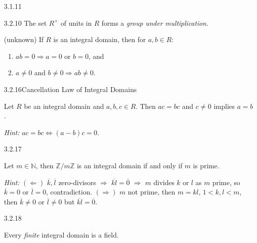 \documentclass[10pt]{article} %
\newcommand{\Hint}{\vspace{0.2em}\textit{Hint: }}
\begin{document}
\begin{multicols}{3}
\begin{proposition}{3.1.11}{}
\end{proposition}

\begin{proposition}{3.2.10}{}
    The set $R^{\times}$ of units in $R$ forms a \emph{group under multiplication}.
\end{proposition}

\begin{remark}{(unknown)}{}
    If $R$ is an integral domain, then for $a,b \in R$:

    \begin{enumerate}[(1)]
        \setlength{\parskip}{0em}
        \item $ab = 0 \Rightarrow a = 0$ or $b = 0$, and
        \item $a \neq 0$ and $b \neq 0 \Rightarrow ab \neq 0$.
    \end{enumerate}
\end{remark}

\begin{proposition}{3.2.16}{Cancellation Law of Integral Domains}

    Let $R$ be an integral domain and $a,b,c \in R$. Then $ac = bc$ and $c \neq 0$ implies $a = b$.

    \Hint $ac = bc \Leftrightarrow (a - b)c = 0$.

\end{proposition}

\begin{proposition}{3.2.17}{}

    Let $m \in \mathbb{N}$, then $\mathbb{Z}/m\mathbb{Z}$ is an integral domain if and only if $m$ is prime.

    \Hint $(\Leftarrow)$ $\overline{k},\overline{l}$ zero-divisors $\Rightarrow$ $\overline{kl}=\overline{0}$ $\Rightarrow$ $m$ divides $k$ or $l$ as $m$ prime, so $\overline{k} = 0$ or $\overline{l} = 0$, contradiction. $(\Rightarrow)$ $m$ not prime, then $m = kl$, $1 < k,l < m$, then $\overline{k} \neq 0$ or $\overline{l} \neq 0$ but $\overline{kl} = \overline{0}$.

\end{proposition}

\begin{theorem}{3.2.18}{}

    Every \emph{finite} integral domain is a field.


\end{theorem}
\end{multicols}
\end{document}
